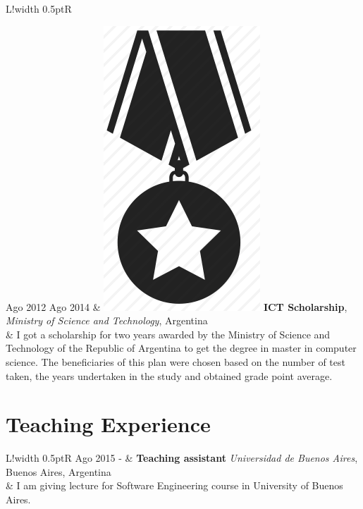 \documentclass[10pt]{article}
\newcommand\VRule{\color{lightgray}\vrule width 0.5pt}
\begin{document}
\begin{tabular}{L!{\VRule}R}

Ago 2012 Ago 2014 & \includegraphics[scale=0.022]{../img/medal.png}
\textbf{ICT Scholarship}, \textit{Ministry of Science and 
Technology}, Argentina\\
& \vspace{-0.7cm} I got a scholarship for two years awarded by the Ministry of 
Science and Technology of the Republic of Argentina to
get the degree in master in computer science. The beneficiaries of this plan were chosen based on 
the number of test
taken, the years undertaken in the study and obtained grade point average.\\
\end{tabular}






\section*{Teaching Experience}

\begin{tabular}{L!{\VRule}R}
Ago 2015 - & \textbf{Teaching assistant} \textit{Universidad de Buenos 
Aires}, Buenos 
Aires, Argentina\\
& I am giving lecture for Software Engineering course in University of Buenos Aires.\\
\end{tabular}
\end{document}
